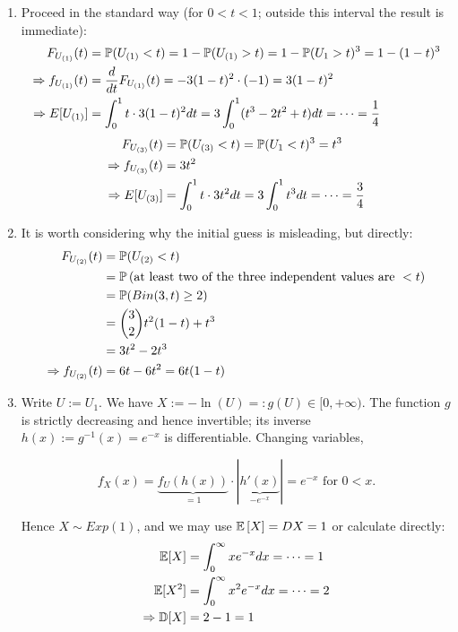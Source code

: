 \documentclass[a4paper]{report}
\begin{document}
\begin{solution}
    \begin{enumerate}
        \def\U#1{U_{(#1)}}
        \def\F#1{F_{U_{(#1)}}}
        \def\f#1{f_{U_{(#1)}}}
        \def\Ex#1{E[U_{(#1)}]}
        \item Proceed in the standard way (for $0<t<1$; outside this interval the result is immediate):
        \begin{align*}
            \F1(t) &= \P(\U1<t) = 1-\P(\U1>t) = 1 - \P(U_1>t)^3 = 1-(1-t)^3 \\
            \Rightarrow \f1(t) &= \frac{d}{dt}\F1(t) = -3(1-t)^2\cdot(-1) = 3(1-t)^2 \\
            \Rightarrow \Ex1 &= \int_0^1t\cdot3(1-t)^2dt = 3\int_0^1(t^3 - 2t^2 + t)dt = \dots = \frac{1}{4}
        \end{align*}
        \begin{align*}
            \F3(t) &= \P(\U3<t) = \P(U_1 < t)^3 = t^3 \\
            \Rightarrow \f3(t) &= 3t^2 \\
            \Rightarrow \Ex3 &= \int_0^1t\cdot3t^2dt = 3\int_0^1t^3dt =\dots=\frac{3}{4}
        \end{align*}

        \item It is worth considering why the initial guess is misleading, but directly:
        \begin{align*}
            \F2(t) &= \P(\U2 < t) \\
                &=\P\left(\text{at least two of the three independent values are }<t\right)\\
                &= \P(Bin(3, t) \ge 2) \\
                &= \binom{3}{2}t^2(1-t) + t^3 \\
                &= 3t^2-2t^3 \\
            \Rightarrow \f2(t) &= 6t - 6t^2 = 6t(1-t)
        \end{align*}

        \item Write $U:=U_1$. We have $X:=-\ln(U)=:g(U)\in[0,+\infty)$. The function $g$ is strictly decreasing and hence invertible; its inverse $h(x):=g^{-1}(x)=e^{-x}$ is differentiable. Changing variables,

        \[f_X(x)=\underbrace{f_U(h(x))}_{=1}\cdot|\underbrace{h'(x)}_{-e^{-x}}|=e^{-x}\text{ for }0<x.\]

        Hence $X\sim Exp(1)$, and we may use $\mathbb {E}\left[ X\right]
        =DX=1$ or calculate directly:
        \begin{align*}
            \mathbb {E}[X] &= \int_{0}^{\infty}xe^{-x}dx = \dots = 1 \\
            \mathbb {E}[X^2] &= \int_{0}^{\infty}x^2e^{-x}dx = \dots = 2 \\
            \Rightarrow \mathbb{D}[X] &= 2 - 1 = 1
        \end{align*}


\end{enumerate}
\end{solution}
\end{document}

